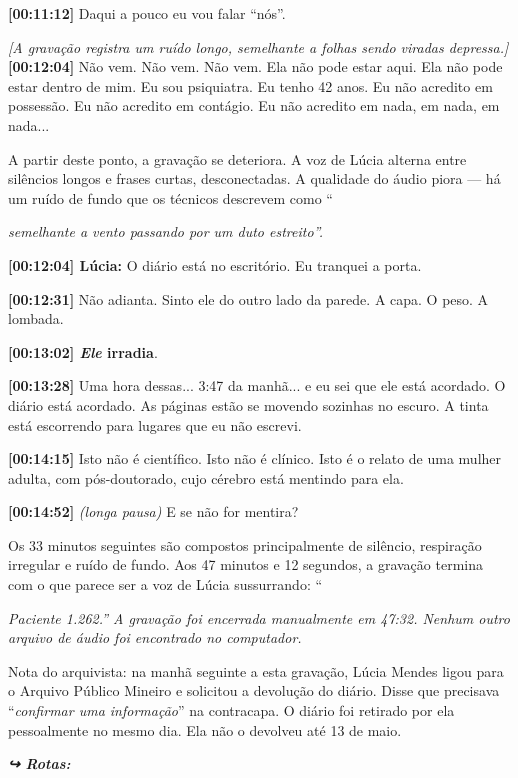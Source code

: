 \noindent \textbf{[00:11:12]} Daqui a pouco eu vou falar \textquotedblleft{}nós\textquotedblright{}.

\noindent \textit{[A gravação registra um ruído longo, semelhante a folhas sendo viradas depressa.]}
\noindent \textbf{[00:12:04]} Não vem. Não vem. Não vem. Ela não pode estar aqui. Ela não pode estar dentro de mim. Eu sou psiquiatra. Eu tenho 42 anos. Eu não acredito em possessão. Eu não acredito em contágio. Eu não acredito em nada, em nada, em nada...

\noindent A partir deste ponto, a gravação se deteriora. A voz de Lúcia alterna entre silêncios longos e frases curtas, desconectadas. A qualidade do áudio piora --- há um ruído de fundo que os técnicos descrevem como \textquotedblleft{\textit{semelhante a vento passando por um duto estreito\textquotedblright{}.}

\noindent \textbf{[00:12:04] Lúcia:} O diário está no escritório. Eu tranquei a porta.

\noindent \textbf{[00:12:31]} Não adianta. Sinto ele do outro lado da parede. A capa. O peso. A lombada.

\noindent \textbf{[00:13:02]\textit{ Ele }irradia}.

\noindent \textbf{[00:13:28]} Uma hora dessas... 3:47 da manhã... e eu sei que ele está acordado. O diário está acordado. As páginas estão se movendo sozinhas no escuro. A tinta está escorrendo para lugares que eu não escrevi.

\noindent \textbf{[00:14:15]} Isto não é científico. Isto não é clínico. Isto é o relato de uma mulher adulta, com pós-doutorado, cujo cérebro está mentindo para ela.

\noindent \textbf{[00:14:52]} \textit{(longa pausa)} E se não for mentira?

\noindent Os 33 minutos seguintes são compostos principalmente de silêncio, respiração irregular e ruído de fundo. Aos 47 minutos e 12 segundos, a gravação termina com o que parece ser a voz de Lúcia sussurrando: \textquotedblleft{\textit{Paciente 1.262.\textquotedblright{} A gravação foi encerrada manualmente em 47:32. Nenhum outro arquivo de áudio foi encontrado no computador.}

\noindent Nota do arquivista: na manhã seguinte a esta gravação, Lúcia Mendes ligou para o Arquivo Público Mineiro e solicitou a devolução do diário. Disse que precisava \textquotedblleft{\textit{confirmar uma informação}\textquotedblright{}} na contracapa. O diário foi retirado por ela pessoalmente no mesmo dia. Ela não o devolveu até 13 de maio.}

\vspace{0.5em}
\noindent\textit{\textbf{↪ Rotas:}  \rotasep {} \rotasep {} \rotasep {}}

}